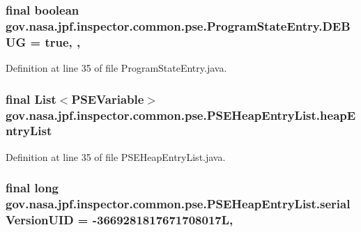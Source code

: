 \subsubsection[{\texorpdfstring{D\+E\+B\+UG}{DEBUG}}]{\setlength{\rightskip}{0pt plus 5cm}final boolean gov.\+nasa.\+jpf.\+inspector.\+common.\+pse.\+Program\+State\+Entry.\+D\+E\+B\+UG = true\hspace{0.3cm}{\ttfamily [static]}, {\ttfamily [protected]}, {\ttfamily [inherited]}}\hypertarget{classgov_1_1nasa_1_1jpf_1_1inspector_1_1common_1_1pse_1_1_program_state_entry_a84ef5e9f23ec651d7a67a8ee72819b0e}{}\label{classgov_1_1nasa_1_1jpf_1_1inspector_1_1common_1_1pse_1_1_program_state_entry_a84ef5e9f23ec651d7a67a8ee72819b0e}


Definition at line 35 of file Program\+State\+Entry.\+java.

\subsubsection[{\texorpdfstring{heap\+Entry\+List}{heapEntryList}}]{\setlength{\rightskip}{0pt plus 5cm}final List$<${\bf P\+S\+E\+Variable}$>$ gov.\+nasa.\+jpf.\+inspector.\+common.\+pse.\+P\+S\+E\+Heap\+Entry\+List.\+heap\+Entry\+List\hspace{0.3cm}{\ttfamily [private]}}\hypertarget{classgov_1_1nasa_1_1jpf_1_1inspector_1_1common_1_1pse_1_1_p_s_e_heap_entry_list_a777716a1bbb347600a7b8c7ff40c9268}{}\label{classgov_1_1nasa_1_1jpf_1_1inspector_1_1common_1_1pse_1_1_p_s_e_heap_entry_list_a777716a1bbb347600a7b8c7ff40c9268}


Definition at line 35 of file P\+S\+E\+Heap\+Entry\+List.\+java.

\subsubsection[{\texorpdfstring{serial\+Version\+U\+ID}{serialVersionUID}}]{\setlength{\rightskip}{0pt plus 5cm}final long gov.\+nasa.\+jpf.\+inspector.\+common.\+pse.\+P\+S\+E\+Heap\+Entry\+List.\+serial\+Version\+U\+ID = -\/3669281817671708017L\hspace{0.3cm}{\ttfamily [static]}, {\ttfamily [private]}}\hypertarget{classgov_1_1nasa_1_1jpf_1_1inspector_1_1common_1_1pse_1_1_p_s_e_heap_entry_list_a3a38b1f254aac98575d01c1c0014cbb9}{}\label{classgov_1_1nasa_1_1jpf_1_1inspector_1_1common_1_1pse_1_1_p_s_e_heap_entry_list_a3a38b1f254aac98575d01c1c0014cbb9}


